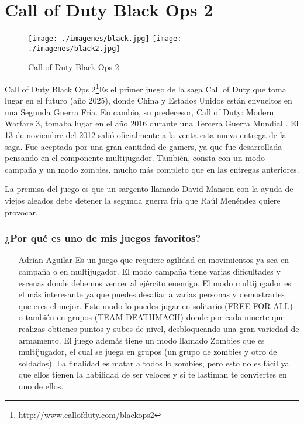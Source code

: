 \section{Call of Duty Black Ops 2}

\begin{figure}[htbp]
\begin{center}
\texttt{[image: ./imagenes/black.jpg]}
\texttt{[image: ./imagenes/black2.jpg]}
\caption{Call of Duty Black Ops 2}
\label{Call of Duty Black Ops 2}
\end{center}
\end{figure}
Call of Duty Black Ops 2\footnote{\url{http://www.callofduty.com/blackops2}}Es el primer juego de la saga Call of Duty que toma lugar en el futuro (año 2025), donde China y Estados Unidos están envueltos en una Segunda Guerra Fría. En cambio, su predecesor, Call of Duty: Modern Warfare 3, tomaba lugar en el año 2016 durante una Tercera Guerra Mundial . El 13 de noviembre del 2012 salió  oficialmente a la venta esta nueva entrega de la saga. Fue aceptada por una gran cantidad de gamers, ya que fue desarrollada pensando en el componente multijugador. También, consta con un modo campaña y un modo zombies, mucho más completo que en las entregas anteriores.

La premisa del juego es que un sargento llamado David Manson con la ayuda de viejos aleados debe detener la segunda guerra fría que Raúl Menéndez quiere provocar.

\subsubsection{¿Por qué es uno de mis juegos favoritos?}
\begin{itemize}
\item[Adrian Aguilar]Es un juego que requiere agilidad en movimientos ya sea en campaña o en multijugador. El modo campaña tiene varias dificultades y escenas donde debemos vencer al ejército enemigo. El modo multijugador es el más interesante ya que puedes desafiar a varias personas y demostrarles que eres el mejor. Este modo lo puedes jugar en solitario (FREE FOR ALL) o también en grupos (TEAM DEATHMACH) donde por cada muerte que realizas obtienes puntos y subes de nivel, desbloqueando una gran variedad de armamento. El juego además tiene un modo llamado Zombies que es multijugador, el cual se juega en grupos (un grupo de zombies y otro de soldados). La finalidad es matar a todos lo zombies, pero esto no es fácil ya que ellos tienen la habilidad de ser veloces y si te lastiman te conviertes en uno de ellos.
\end{itemize}